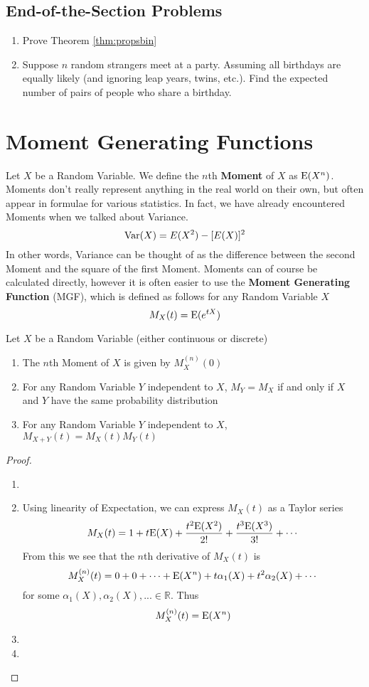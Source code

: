 \documentclass{report}
\begin{document}
\subsection{End-of-the-Section Problems}
\begin{enumerate}
    \item Prove Theorem \ref{thm:propsbin}
    \item Suppose $n$ random strangers meet at a party. Assuming all birthdays are equally likely (and ignoring leap years, twins, etc.). Find the expected number of pairs of people who share a birthday. 
\end{enumerate}


\section{Moment Generating Functions}
Let $X$ be a Random Variable. We define the $n$th \textbf{Moment} of $X$ as $\textup{E}(X^n)$. Moments don't really represent anything in the real world on their own, but often appear in formulae for various statistics. In fact, we have already encountered Moments when we talked about Variance.
\[
    \textup{Var}(X)=E(X^2)-[E(X)]^2
\]
In other words, Variance can be thought of as the difference between the second Moment and the square of the first Moment. Moments can of course be calculated directly, however it is often easier to use the \textbf{Moment Generating Function} (MGF), which is defined as follows for any Random Variable $X$
\[
    M_X(t)=\textup{E}(e^{tX})
\]
\begin{theorem}
    Let $X$ be a Random Variable (either continuous or discrete)
    \begin{enumerate}
        \item The $n$th Moment of $X$ is given by $M_X^{(n)}(0)$
        \item For any Random Variable $Y$ independent to $X$, $M_Y=M_X$ if and only if $X$ and $Y$ have the same probability distribution
        \item For any Random Variable $Y$ independent to $X$, $M_{X+Y}(t)=M_X(t)M_Y(t)$
    \end{enumerate}
    \begin{proof}
        \begin{enumerate}
            \item[]
            \item Using linearity of Expectation, we can express $M_X(t)$ as a Taylor series
            \[
                M_X(t)=1+t\textup{E}(X)+\frac{t^2\textup{E}(X^2)}{2!} + \frac{t^3\textup{E}(X^3)}{3!} + \cdots 
            \]
            From this we see that the $n$th derivative of $M_X(t)$ is
            \[
                M_X^{(n)}(t)=0+0+\cdots+\textup{E}(X^n)+ t\alpha_1(X) + t^2 \alpha_2(X) + \cdots
            \]
            for some $\alpha_1(X), \alpha_2(X),...\in\mathbb R$. Thus
            \[
                M_X^{(n)}(t)=\textup{E}(X^n)
            \]
            \item\todo
            \item\todo
        \end{enumerate}
    \end{proof}
\end{theorem}
\label{thm:mgfprops}
\end{document}
